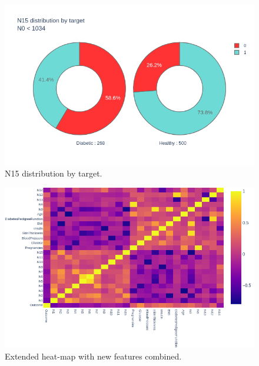 \documentclass[12pt]{article}
\begin{document}
\begin{figure}[ht]
\centering
\includegraphics[width=1\textwidth]{newplot(41).png}
\caption{\label{fig:48} N15 distribution by target.}
\end{figure}

\begin{figure}[ht]
\centering
\includegraphics[width=1\textwidth]{newplot(42).png}
\caption{\label{fig:49} Extended heat-map with new features combined.}
\end{figure}
\clearpage
\newpage
\end{document}
